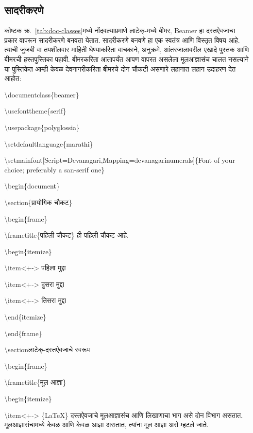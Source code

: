 \documentclass[11pt]{article}
\newcommand{\7}{\textbackslash}
\newcommand{\Syn}{\textenglish}
\begin{document}
\subsection{सादरीकरणे}

कोष्टक क्र.~\ref{tab:doc-classes}मध्ये नोंदवल्याप्रमाणे लाटेक्-मध्ये बीमर,
\Syn{\Bask Beamer}\index{\Syn{ Beamer}} हा दस्तऐवजाचा प्रकार वापरून सादरीकरणे बनवता येतात. सादरीकरणे बनवणे
हा एक स्वतंत्र आणि विस्तृत विषय आहे. त्याची जुजबी वा तपशीलवार माहिती घेण्याकरिता
वाचकाने, अनुक्रमे, आंतरजालावरील एखादे पुस्तक आणि बीमरची हस्तपुस्तिका
पहावी. बीमरकरिता आतापर्यंत आपण वापरत असलेला मूलआज्ञासंच चालत नसल्याने या
पुस्तिकेत आम्ही केवळ देवनागरीकरिता बीमरचे दोन चौकटी असणारे लहानात लहान उदाहरण देत आहोत:
\medskip

 \Syn{\7documentclass\{beamer\}}

 \Syn{\7usefonttheme\{serif\}}
 
 \Syn{\7usepackage\{polyglossia\}}
 
 \Syn{\7setdefaultlanguage\{marathi\}}
 
 \Syn{\7setmainfont[Script=Devanagari,Mapping=devanagarinumerals]\{Font
 of your choice; preferably a san-serif one\}}
 \vspace{0.1in}
 
\Syn{\7begin\{document\}}
\vspace{0.1in}
 
\Syn{\7section}\{प्रायोगिक चौकट\}

\Syn{\7begin\{frame\}}

\Syn{\7frametitle}\{पहिली चौकट\} ही पहिली चौकट आहे.

\Syn{\7begin}\{itemize\}

\Syn{\7item}<+-> पहिला मुद्दा

\Syn{\7item}<+-> दुसरा मुद्दा

\Syn{\7item}<+-> तिसरा मुद्दा

\Syn{\7end\{itemize\}}

\Syn{\7end\{frame\}}
\vspace{0.1in}

\Syn{\7section}{लाटेक्-दस्तऐवजाचे स्वरूप}

\Syn{\7begin}\{frame\}
 
\Syn{\7frametitle}\{मूल आज्ञा\}

\Syn{\7begin}\{itemize\}

 \Syn{\7item<+-> \{\LaTeX\}} दस्तऐवजाचे मूलआज्ञासंच आणि लिखाणाचा भाग असे दोन विभाग असतात. मूलआज्ञासंचामध्ये केवळ आणि केवळ आज्ञा असतात, त्यांना मूल आज्ञा असे म्हटले
 जाते.
\end{document}
